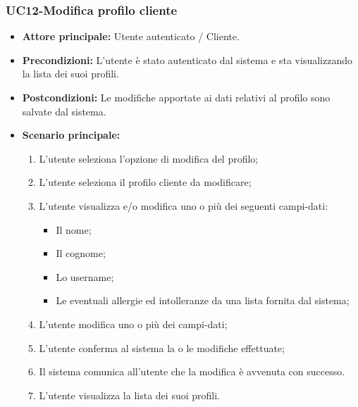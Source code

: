 \subsubsection{UC12-Modifica profilo cliente}
\begin{itemize}
\item \textbf{Attore principale:} Utente autenticato / Cliente.
\item \textbf{Precondizioni:} L'utente è stato autenticato dal sistema e sta visualizzando la lista dei suoi profili.
\item \textbf{Postcondizioni:} Le modifiche apportate ai dati relativi al profilo sono salvate dal sistema.
\item \textbf{Scenario principale:}
\begin{enumerate}
    \item L'utente seleziona l'opzione di modifica del profilo;
    \item L'utente seleziona il profilo cliente da modificare;
    \item L'utente visualizza e/o modifica uno o più dei seguenti campi-dati:
        \begin{itemize}
            \item Il nome;
            \item Il cognome;
            \item Lo username;
            \item Le eventuali allergie ed intolleranze da una lista fornita dal sistema;
        \end{itemize}
    \item L'utente modifica uno o più dei campi-dati;
    \item L'utente conferma al sistema la o le modifiche effettuate;
    \item Il sistema comunica all'utente che la modifica è avvenuta con successo.
    \item L'utente visualizza la lista dei suoi profili.
\end{enumerate}
\end{itemize}

